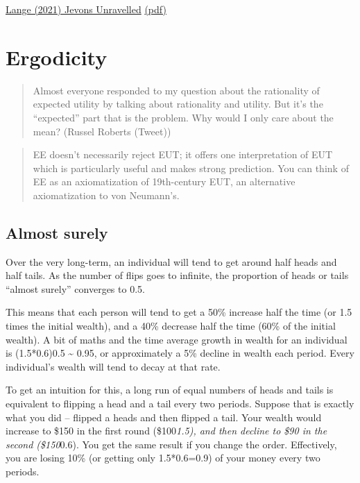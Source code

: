 \documentclass[
]{book}
\begin{document}
\href{https://www.sciencedirect.com/science/article/pii/S221462962100075X}{Lange (2021) Jevons Unravelled}
\href{pdf/Lange_2021_Jevons_Unravelled.pdf}{(pdf)}

\hypertarget{ergodicity}{%
\chapter{Ergodicity}\label{ergodicity}}

\begin{quote}
Almost everyone responded to my question about the rationality of expected utility by talking about rationality and utility. But it's the ``expected'' part that is the problem. Why would I only care about the mean? (Russel Roberts (Tweet))
\end{quote}

\begin{quote}
EE doesn't necessarily reject EUT; it offers one interpretation of EUT which is particularly useful and makes strong prediction. You can think of EE as an axiomatization of 19th-century EUT, an alternative axiomatization to von Neumann's.
\end{quote}

\hypertarget{almost-surely}{%
\section{Almost surely}\label{almost-surely}}

Over the very long-term, an individual will tend to get around half heads and half tails. As the number of flips goes to infinite, the proportion of heads or tails ``almost surely'' converges to 0.5.

This means that each person will tend to get a 50\% increase half the time (or 1.5 times the initial wealth), and a 40\% decrease half the time (60\% of the initial wealth). A bit of maths and the time average growth in wealth for an individual is (1.5*0.6)0.5 \textasciitilde{} 0.95, or approximately a 5\% decline in wealth each period. Every individual's wealth will tend to decay at that rate.

To get an intuition for this, a long run of equal numbers of heads and tails is equivalent to flipping a head and a tail every two periods. Suppose that is exactly what you did -- flipped a heads and then flipped a tail. Your wealth would increase to \$150 in the first round (\$100\emph{1.5), and then decline to \$90 in the second (\$150}0.6). You get the same result if you change the order. Effectively, you are losing 10\% (or getting only 1.5*0.6=0.9) of your money every two periods.
\end{document}
